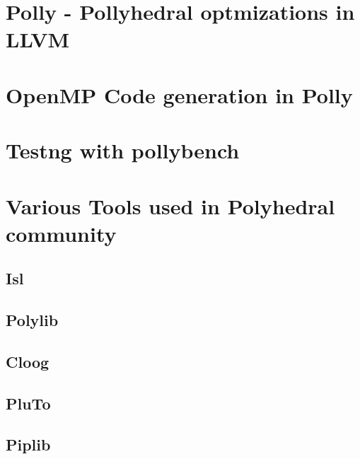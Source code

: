 \documentclass[MTech]{iitmdiss}
\begin{document}
\chapter{Polly - Pollyhedral optmizations in LLVM}


\chapter{OpenMP Code generation in Polly}


\chapter{Testng with pollybench}


%




\appendix
 
\chapter{Various Tools used in Polyhedral community}
\section{Isl}
\section{Polylib}
\section{Cloog}
\section{PluTo}
\section{Piplib}
\end{document}
